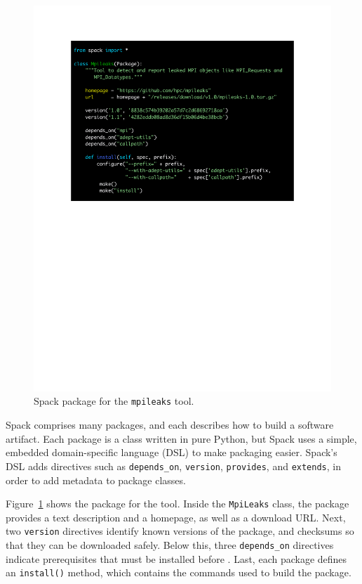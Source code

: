 \begin{figure}
	\includegraphics[width=\columnwidth]{code/mpileaks.pdf}
	\caption{
		Spack package for the {\tt mpileaks} tool.
		\label{fig:mpileaks}
	}
\end{figure}

Spack comprises many packages, and each describes how to build a software
artifact.  Each package is a class written in pure Python, but Spack uses
a simple, embedded domain-specific language (DSL) to make packaging easier.
Spack's DSL adds directives such as {\tt depends\_on}, {\tt version},
{\tt provides}, and {\tt extends}, in order to add metadata to package classes.

Figure~\ref{fig:mpileaks} shows the package for the \mpileaks tool.
Inside the {\tt MpiLeaks} class, the package provides a text description
and a homepage, as well as 
a download URL.  Next, two {\tt version} directives identify known versions
of the package, and checksums so that they can be downloaded safely.
Below this, three {\tt depends\_on}
directives indicate prerequisites that must be installed before \mpileaks.
Last, each package defines an {\tt install()} method, which contains the
commands used to build the package.

